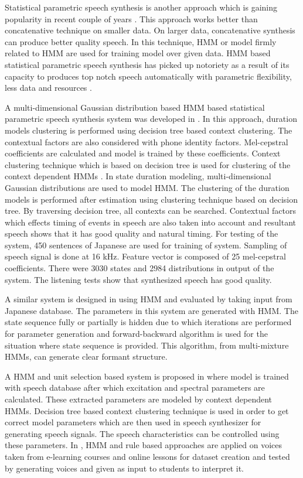 Statistical parametric speech synthesis is another approach which is gaining popularity in recent couple of years \cite{king2010beginners}. This approach works better than concatenative technique on smaller data. On larger data, concatenative synthesis can produce better quality speech. In this technique, HMM or model firmly related to HMM are used for training model over given data. HMM based statistical parametric speech synthesis has picked up notoriety as a result of its capacity to produces top notch speech automatically with parametric flexibility, less data and resources \cite{black2007statistical}.

A multi-dimensional Gaussian distribution based HMM based statistical parametric speech synthesis system was developed in \cite{yoshimura1998duration}. In this approach, duration models clustering is performed using decision tree based context clustering. The contextual factors are also considered with phone identity factors. Mel-cepstral coefficients are calculated and model is trained by these coefficients. Context clustering technique which is based on decision tree is used for clustering of the context dependent HMMs \cite{odellj.j1995}. In state duration modeling, multi-dimensional Gaussian distributions are used to model HMM. The clustering of the duration models is performed after estimation using clustering technique based on decision tree. By traversing decision tree, all contexts can be searched. Contextual factors which effects timing of events in speech are also taken into account and resultant speech shows that it has good quality and natural timing. For testing of the system, 450 sentences of Japanese are used for training of system. Sampling of speech signal is done at 16 kHz. Feature vector is composed of 25 mel-cepstral coefficients. There were 3030 states and 2984 distributions in output of the system. The listening tests show that synthesized speech has good quality.

A similar system is designed in \cite{tokuda2000speech} using HMM and evaluated by taking input from Japanese database. The parameters in this system are generated with HMM. The state sequence fully or partially is hidden due to which iterations are performed for parameter generation and forward-backward algorithm is used for the situation where state sequence is provided. This algorithm, from multi-mixture HMMs, can generate clear formant structure.

A HMM and unit selection based system is proposed in \cite{tokuda2002hmm} where model is trained with speech database after which excitation and spectral parameters are calculated. These extracted parameters are modeled by context dependent HMMs. Decision tree based context clustering technique is used in order to get correct model parameters which are then used in speech synthesizer for generating speech signals. The speech characteristics can be controlled using these parameters. In \cite{harashima2006review}, HMM and rule based approaches are applied on voices taken from e-learning courses and online lessons for dataset creation and tested by generating voices and given as input to students to interpret it.

